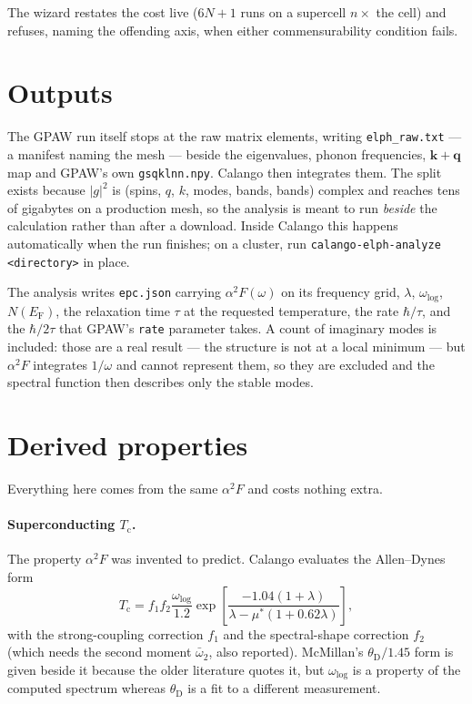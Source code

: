 The wizard restates the cost live ($6N+1$ runs on a supercell $n\times$ the
cell) and refuses, naming the offending axis, when either commensurability
condition fails.

\section{Outputs}

The GPAW run itself stops at the raw matrix elements, writing
\texttt{elph\_raw.txt} --- a manifest naming the mesh --- beside the
eigenvalues, phonon frequencies, $\mathbf{k}+\mathbf{q}$ map and GPAW's own
\texttt{gsqklnn.npy}. Calango then integrates them. The split exists because
$|g|^2$ is (spins, $q$, $k$, modes, bands, bands) complex and reaches tens of
gigabytes on a production mesh, so the analysis is meant to run \emph{beside}
the calculation rather than after a download. Inside Calango this happens
automatically when the run finishes; on a cluster, run
\texttt{calango-elph-analyze <directory>} in place.

The analysis writes \texttt{epc.json} carrying $\alpha^2F(\omega)$ on its frequency
grid, $\lambda$, $\omega_{\log}$, $N(E_\mathrm{F})$, the relaxation time
$\tau$ at the requested temperature, the rate $\hbar/\tau$, and the
$\hbar/2\tau$ that GPAW's \texttt{rate} parameter takes. A count of imaginary
modes is included: those are a real result --- the structure is not at a local
minimum --- but $\alpha^2F$ integrates $1/\omega$ and cannot represent them, so
they are excluded and the spectral function then describes only the stable
modes.

\section{Derived properties}

Everything here comes from the same $\alpha^2F$ and costs nothing extra.

\paragraph{Superconducting $T_\mathrm{c}$.} The property $\alpha^2F$ was
invented to predict. Calango evaluates the Allen--Dynes form
\begin{equation}
  T_\mathrm{c} = f_1 f_2 \frac{\omega_{\log}}{1.2}
    \exp\!\left[\frac{-1.04(1+\lambda)}{\lambda - \mu^*(1+0.62\lambda)}\right],
\end{equation}
with the strong-coupling correction $f_1$ and the spectral-shape correction
$f_2$ (which needs the second moment $\bar\omega_2$, also reported).
McMillan's $\theta_\mathrm{D}/1.45$ form is given beside it because the older
literature quotes it, but $\omega_{\log}$ is a property of the computed
spectrum whereas $\theta_\mathrm{D}$ is a fit to a different measurement.


